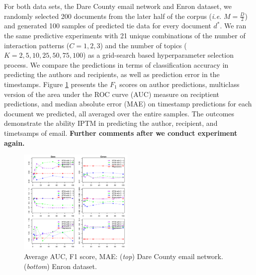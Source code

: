 \documentclass[twoside]{article}
\begin{document}
 For both data sets, the Dare County email network and Enron dataset, we randomly selected 200 documents from the later half of the corpus (\textit{i.e.} $M = \frac{D}{2}$) and generated 100 samples of predicted tie data for every document $d^*$. We ran the same predictive experiments with 21 unique combinations of the number of interaction patterns ($C = 1, 2, 3$) and the number of topics ($K = 2, 5, 10, 25, 50, 75, 100$) as a grid-search based hyperparameter selection process. We compare the predictions in terms of classification accuracy in predicting the authors and recipients, as well as prediction error in the timestamps. Figure \ref{fig:PPE} presents the $F_1$ scores on author predictions, multiclass version of the area under the ROC curve (AUC) measure \citep{hand2001simple} on reciptient predictions, and median absolute error (MAE) on timestamp predictions for each document we predicted, all averaged over the entire samples. The outcomes demonstrate the ability IPTM in predicting the author, recipient, and timetsamps of email. \textbf{Further comments after we conduct experiment again.}
 \begin{figure}[h]
 	\centering
	\includegraphics[width=0.49\textwidth, trim= 0.7cm 0cm 0cm 0cm, clip=true]{plots/PPE-1.png}  
 	\caption{Average AUC, F1 score, MAE: (\textit{top}) Dare County email network. (\textit{bottom}) Enron dataset.}
 	 	\label{fig:PPE}	
 	 \end{figure}
\end{document}
